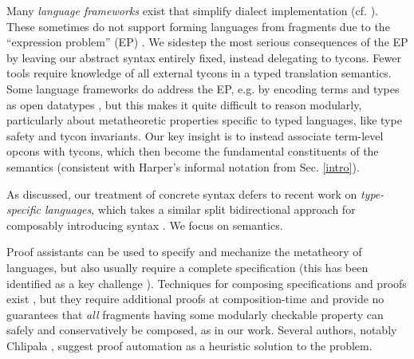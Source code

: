 \documentclass[preprint]{sigplanconf}
\begin{document}
Many \emph{language frameworks} exist that simplify  dialect implementation (cf. \cite{erdweg2013state}). %
These sometimes do not support forming  languages from fragments due to the ``expression problem'' (EP) \cite{wadler1998expression,Reynolds75}. We sidestep the most serious consequences of the EP by leaving our abstract syntax entirely fixed, instead  delegating to tycons. Fewer tools require knowledge of all external tycons in a typed translation semantics. Some language frameworks do address the EP, e.g. by encoding terms and types as open datatypes \cite{conf/ppdp/LohH06}, but this makes it quite difficult to reason modularly, particularly about metatheoretic properties specific to typed languages, like type safety and tycon invariants. Our key insight is to instead associate term-level opcons with tycons, which then become the fundamental constituents of the semantics (consistent with Harper's informal notation from Sec. \ref{intro}).

As discussed, our treatment of concrete syntax defers to recent work on \emph{type-specific languages}, which takes a similar split bidirectional approach for composably introducing syntax \cite{TSLs}. We focus on  semantics.

Proof assistants can be used to specify and mechanize the metatheory of languages, but also usually require a complete specification (this  has been identified as a key challenge \cite{aydemir05tphols}). Techniques for composing specifications and proofs exist \cite{conf/popl/DelawareOS13,Delaware11,conf/plpv/SchwaabS13}, but they  require additional proofs at composition-time and provide no guarantees that \emph{all} fragments having some modularly checkable property can safely and  conservatively be composed, as in our work. %
Several authors, notably Chlipala  \cite{Chlipala10}, suggest  proof automation as a heuristic solution to the problem. 
\end{document}
